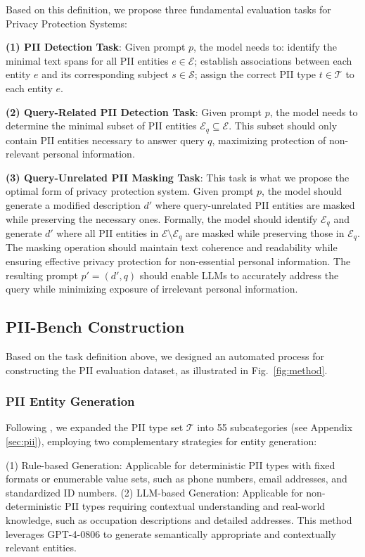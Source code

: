 Based on this definition, we propose three fundamental evaluation tasks for Privacy Protection Systems:

\textbf{(1) PII Detection Task}:
Given prompt $p$, the model needs to: 
identify the minimal text spans for all PII entities $e \in \mathcal{E}$;
establish associations between each entity $e$ and its corresponding subject $s \in \mathcal{S}$;
assign the correct PII type $t \in \mathcal{T}$ to each entity $e$.

\textbf{(2) Query-Related PII Detection Task}:
Given prompt $p$, the model needs to determine the minimal subset of PII entities $\mathcal{E}_q \subseteq \mathcal{E}$. 
This subset should only contain PII entities necessary to answer query $q$, maximizing protection of non-relevant personal information.

\textbf{(3) Query-Unrelated PII Masking Task}:
This task is what we propose the optimal form of privacy protection system.
Given prompt $p$, the model should generate a modified description $d'$ where query-unrelated PII entities are masked while preserving the necessary ones. Formally, the model should identify $\mathcal{E}_q$ and generate $d'$ where all PII entities in $\mathcal{E} \setminus \mathcal{E}_q$ are masked while preserving those in $\mathcal{E}_q$. 
The masking operation should maintain text coherence and readability while ensuring effective privacy protection for non-essential personal information.
The resulting prompt $p' = (d', q)$ should enable LLMs to accurately address the query while minimizing exposure of irrelevant personal information.


\subsection{PII-Bench Construction}

Based on the task definition above, we designed an automated process for constructing the PII evaluation dataset, as illustrated in Fig.~\ref{fig:method}.

\subsubsection{PII Entity Generation}
Following \citet{papadopoulou2022neural}, we expanded the PII type set $\mathcal{T}$ into 55 subcategories (see Appendix \ref{sec:pii}), employing two complementary strategies for entity generation:

(1) Rule-based Generation: Applicable for deterministic PII types with fixed formats or enumerable value sets, such as phone numbers, email addresses, and standardized ID numbers.
(2) LLM-based Generation: Applicable for non-deterministic PII types requiring contextual understanding and real-world knowledge, such as occupation descriptions and detailed addresses.
This method leverages GPT-4-0806 to generate semantically appropriate and contextually relevant entities.

